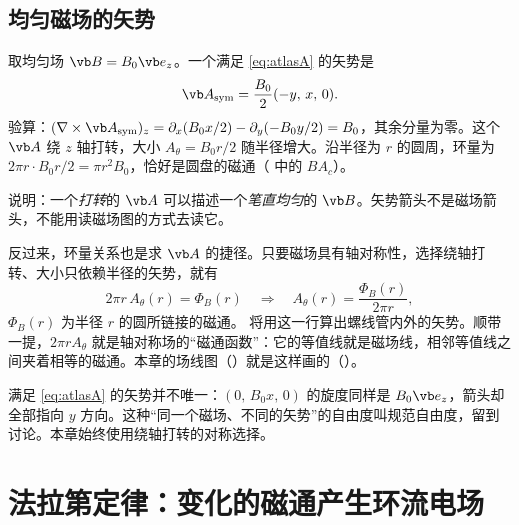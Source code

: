 \subsection{均匀磁场的矢势}
取均匀场 $\vb B=B_0\vb e_z$。一个满足 \eqref{eq:atlasA} 的矢势是
\begin{equation}
\vb A_{\rm sym}=\frac{B_0}{2}(-y,\,x,\,0).
\end{equation}
验算：$(\nabla\times\vb A_{\rm sym})_z=\partial_x(B_0x/2)-\partial_y(-B_0y/2)=B_0$，其余分量为零。这个 $\vb A$ 绕 $z$ 轴打转，大小 $A_\theta=B_0r/2$ 随半径增大。沿半径为 $r$ 的圆周，环量为 $2\pi r\cdot B_0r/2=\pi r^2B_0$，恰好是圆盘的磁通（ 中的 $BA_c$）。


 说明：一个\emph{打转}的 $\vb A$ 可以描述一个\emph{笔直均匀}的 $\vb B$。矢势箭头不是磁场箭头，不能用读磁场图的方式去读它。

反过来，环量关系也是求 $\vb A$ 的捷径。只要磁场具有轴对称性，选择绕轴打转、大小只依赖半径的矢势，就有
\begin{equation}
2\pi r\,A_\theta(r)=\Phi_B(r)\quad\Longrightarrow\quad A_\theta(r)=\frac{\Phi_B(r)}{2\pi r},
\label{eq:Afromflux}
\end{equation}
$\Phi_B(r)$ 为半径 $r$ 的圆所链接的磁通。 将用这一行算出螺线管内外的矢势。顺带一提，$2\pi rA_\theta$ 就是轴对称场的“磁通函数”：它的等值线就是磁场线，相邻等值线之间夹着相等的磁通。本章的场线图（）就是这样画的（）。

满足 \eqref{eq:atlasA} 的矢势并不唯一：$(0,\,B_0x,\,0)$ 的旋度同样是 $B_0\vb e_z$，箭头却全部指向 $y$ 方向。这种“同一个磁场、不同的矢势”的自由度叫规范自由度，留到 讨论。本章始终使用绕轴打转的对称选择。

\section{法拉第定律：变化的磁通产生环流电场}\label{sec:magnetic-faraday}

